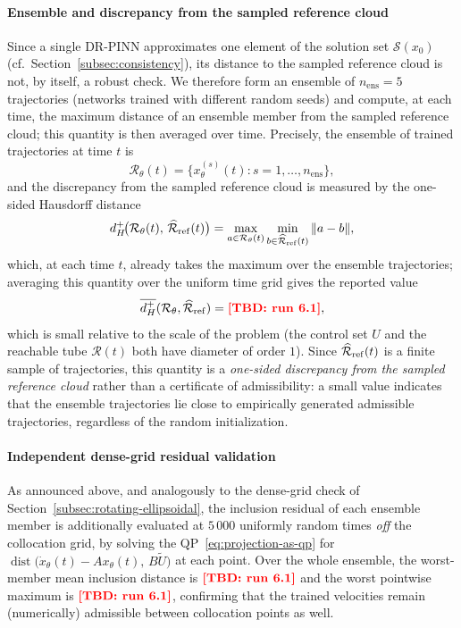 \documentclass[11pt]{elsarticle}
\newcommand{\TBD}[1]{{\color{red}\textbf{[TBD: #1]}}}
\providecommand{\LCMeanDH}{\TBD{run 6.1}}
\providecommand{\LCnDense}{5\,000}
\providecommand{\LCResidMeanDense}{\TBD{run 6.1}}
\providecommand{\LCResidMaxDense}{\TBD{run 6.1}}
\theoremstyle{definition}
\theoremstyle{remark}
\numberwithin{equation}{section}
\def\dist{\operatorname{dist}}
\begin{document}
\paragraph{Ensemble and discrepancy from the sampled reference cloud}
Since a single DR-PINN approximates one element of the solution set
$\mathcal{S}(x_0)$ (cf.\ Section~\ref{subsec:consistency}), its distance to
the sampled reference cloud is not, by itself, a robust check. We therefore
form an ensemble of $n_{\mathrm{ens}} = 5$ trajectories (networks trained
with different random seeds) and compute, at each time, the maximum
distance of an ensemble member from the sampled reference cloud; this
quantity is then averaged over time. Precisely, the ensemble of trained
trajectories at time $t$ is
\[
  \mathcal{R}_\theta(t) = \bigl\{x_\theta^{(s)}(t) : s = 1,\dots,n_{\mathrm{ens}}\bigr\},
\]
and the discrepancy from the sampled reference cloud is measured by the
one-sided Hausdorff distance
\[
  d_H^+\!\bigl(\mathcal{R}_\theta(t),\,\widehat{\mathcal{R}}_{\rm ref}(t)\bigr)
  = \max_{a \in \mathcal{R}_\theta(t)}\min_{b \in \widehat{\mathcal{R}}_{\rm ref}(t)}\|a-b\|,
\]
which, at each time $t$, already takes the maximum over the ensemble
trajectories; averaging this quantity over the uniform time grid gives the
reported value
\[
  \overline{d_H^+}(\mathcal{R}_\theta,\widehat{\mathcal{R}}_{\rm ref}) = \LCMeanDH,
\]
which is small relative to the scale of the problem (the control set $U$ and
the reachable tube $\mathcal{R}(t)$ both have diameter of order $1$).
Since $\widehat{\mathcal{R}}_{\rm ref}(t)$ is a finite sample of
trajectories, this quantity is a \emph{one-sided discrepancy from the
sampled reference cloud} rather than a certificate of admissibility: a small
value indicates that the ensemble trajectories lie close to empirically
generated admissible trajectories, regardless of the random initialization.

\paragraph{Independent dense-grid residual validation}
As announced above, and analogously to the dense-grid check of
Section~\ref{subsec:rotating-ellipsoidal}, the inclusion residual of each
ensemble member is additionally evaluated at $\LCnDense$ uniformly random
times \emph{off} the collocation grid, by solving the
QP~\eqref{eq:projection-as-qp} for
$\dist\!\bigl(\dot x_\theta(t)-Ax_\theta(t),\,B\widetilde U\bigr)$ at each
point. Over the whole ensemble, the worst-member mean inclusion distance is
$\LCResidMeanDense$ and the worst pointwise maximum is
$\LCResidMaxDense$, confirming that the trained velocities remain
(numerically) admissible between collocation points as well.
\end{document}
